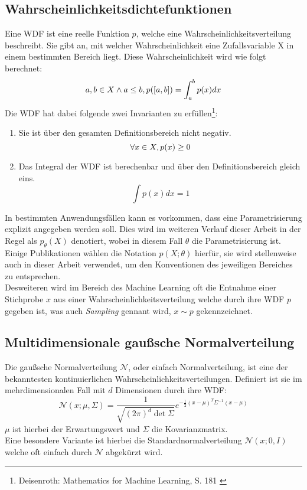\subsection{Wahrscheinlichkeitsdichtefunktionen}
Eine \ac{WDF} ist eine reelle Funktion $p$, welche eine Wahrscheinlichkeitsverteilung beschreibt. Sie gibt an, mit welcher Wahrscheinlichkeit eine Zufallsvariable X in einem bestimmten Bereich liegt. Diese Wahrscheinlichkeit wird wie folgt berechnet:
\begin{equation}
    a,b \in X \land a \le b, \space p([a, b]) = \int_a^b p(x) dx
\end{equation}
Die \ac{WDF} hat dabei folgende zwei Invarianten zu erfüllen\footnote{
    Deisenroth: Mathematics for Machine Learning, S. 181
    \cite{Deisenroth2020}
}:
\begin{enumerate}
    \item Sie ist über den gesamten Definitionsbereich nicht negativ. 
    \begin{equation}
        \forall x \in X, \space p(x) \ge 0
    \end{equation}
    \item Das Integral der \ac{WDF} ist berechenbar und über den Definitionsbereich gleich eins.
    \begin{equation}
        \int p(x) dx = 1
    \end{equation}
\end{enumerate}
In bestimmten Anwendungsfällen kann es vorkommen, dass eine Parametrisierung explizit angegeben werden soll. Dies wird im weiteren Verlauf dieser Arbeit in der Regel als $p_\theta(X)$ denotiert, wobei in diesem Fall $\theta$ die Parametrisierung ist. Einige Publikationen wählen die Notation $p(X; \theta)$ hierfür, sie wird stellenweise auch in dieser Arbeit verwendet, um den Konventionen des jeweiligen Bereiches zu entsprechen. \\
Desweiteren wird im Bereich des Machine Learning oft die Entnahme einer Stichprobe $x$ aus einer Wahrscheinlichkeitsverteilung welche durch ihre \ac{WDF} $p$ gegeben ist, was auch \textit{Sampling} gennant wird, $x \sim p$ gekennzeichnet. 


\subsection{Multidimensionale gaußsche Normalverteilung}

Die gaußsche Normalverteilung $\mathcal N$, oder einfach Normalverteilung, ist eine der bekanntesten kontinuierlichen Wahrscheinlichkeitsverteilungen. Definiert ist sie im mehrdimensionalen Fall mit $d$ Dimensionen durch ihre \ac{WDF}:
\begin{equation}
    \mathcal N(x; \mu, \Sigma) = 
    \frac{1}{\sqrt{(2\pi)^d \det{\Sigma}}}
    e^{-\frac{1}{2}(x-\mu)^T \Sigma^{-1} (x-\mu)}
\end{equation}
$\mu$ ist hierbei der Erwartungswert und $\Sigma$ die Kovarianzmatrix. \\
Eine besondere Variante ist hierbei die Standardnormalverteilung $\mathcal N(x; 0, I)$ welche oft einfach durch $\mathcal N$ abgekürzt wird.

